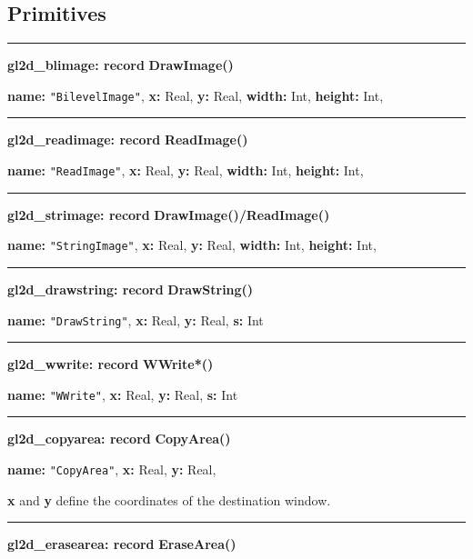 \documentclass[letterpaper,12pt]{article}
\begin{document}
\subsection{Primitives}

\bigskip\hrule\vspace{0.1cm}
\noindent
{\bf gl2d\_blimage: record} \hfill {\bf DrawImage()}

{\bf name:} \texttt{"BilevelImage"},\newline\indent
{\bf x:} Real,
{\bf y:} Real,
{\bf width:} Int,
{\bf height:} Int,

\bigskip\hrule\vspace{0.1cm}
\noindent
{\bf gl2d\_readimage: record} \hfill {\bf ReadImage()} 

{\bf name:} \texttt{"ReadImage"},\newline\indent
{\bf x:} Real,
{\bf y:} Real,
{\bf width:} Int,
{\bf height:} Int,

\bigskip\hrule\vspace{0.1cm}
\noindent
{\bf gl2d\_strimage: record} \hfill {\bf DrawImage()/ReadImage()} 

{\bf name:} \texttt{"StringImage"},\newline\indent
{\bf x:} Real,
{\bf y:} Real,
{\bf width:} Int,
{\bf height:} Int,

\bigskip\hrule\vspace{0.1cm}
\noindent
{\bf gl2d\_drawstring: record} \hfill {\bf DrawString()} 

{\bf name:} \texttt{"DrawString"},\newline\indent
{\bf x:} Real,
{\bf y:} Real,
{\bf s:} Int

\bigskip\hrule\vspace{0.1cm}
\noindent
{\bf gl2d\_wwrite: record} \hfill {\bf WWrite*()} 

{\bf name:} \texttt{"WWrite"},\newline\indent
{\bf x:} Real,
{\bf y:} Real,
{\bf s:} Int

\bigskip\hrule\vspace{0.1cm}
\noindent
{\bf gl2d\_copyarea: record} \hfill {\bf CopyArea()} 

{\bf name:} \texttt{"CopyArea"},\newline\indent
{\bf x:} Real,
{\bf y:} Real,

\noindent
{\bf x} and {\bf y} define the coordinates of the destination window.

\newpage\hrule\vspace{0.1cm}
\noindent
{\bf gl2d\_erasearea: record} \hfill {\bf EraseArea()} 
\end{document}
